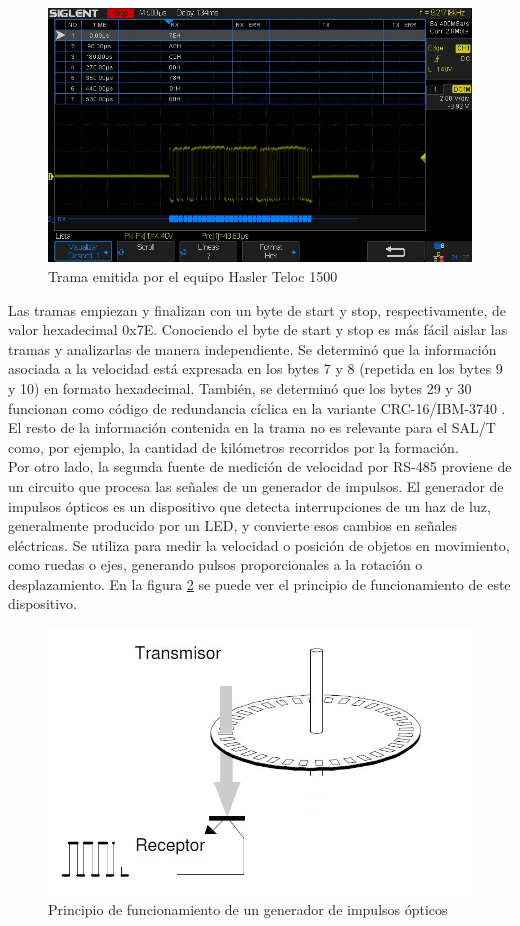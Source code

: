 \begin{figure}[H]
    \centering
    \includegraphics[width =\linewidth]{img/hasler_trama.png}
    \caption{Trama emitida por el equipo Hasler Teloc 1500}
    \label{fig:hasler_trama}
\end{figure}    

Las tramas empiezan y finalizan con un byte de start y stop, respectivamente, de valor hexadecimal 0x7E. Conociendo el byte de start y stop es más fácil aislar las tramas y analizarlas de manera independiente. Se determinó que la información asociada a la velocidad está expresada en los bytes 7 y 8 (repetida en los bytes 9 y 10) en formato hexadecimal. También, se determinó que los bytes 29 y 30 funcionan como código de redundancia cíclica en la variante CRC-16/IBM-3740 \cite{crc}. El resto de la información contenida en la trama no es relevante para el SAL/T como, por ejemplo, la cantidad de kilómetros recorridos por la formación. \\


Por otro lado, la segunda fuente de medición de velocidad por RS-485 proviene de un circuito que procesa las señales de un generador de impulsos. El generador de impulsos ópticos es un dispositivo que detecta interrupciones de un haz de luz, generalmente producido por un LED, y convierte esos cambios en señales eléctricas. Se utiliza para medir la velocidad o posición de objetos en movimiento, como ruedas o ejes, generando pulsos proporcionales a la rotación o desplazamiento. En la figura \ref{fig:pulse_generator} se puede ver el principio de funcionamiento de este dispositivo. 


\begin{figure}[H]
    \centering
    \includegraphics[width = 0.7 \linewidth]{img/pulse_generator.jpeg}
    \caption{Principio de funcionamiento de un generador de impulsos ópticos}
    \label{fig:pulse_generator}
\end{figure}    


